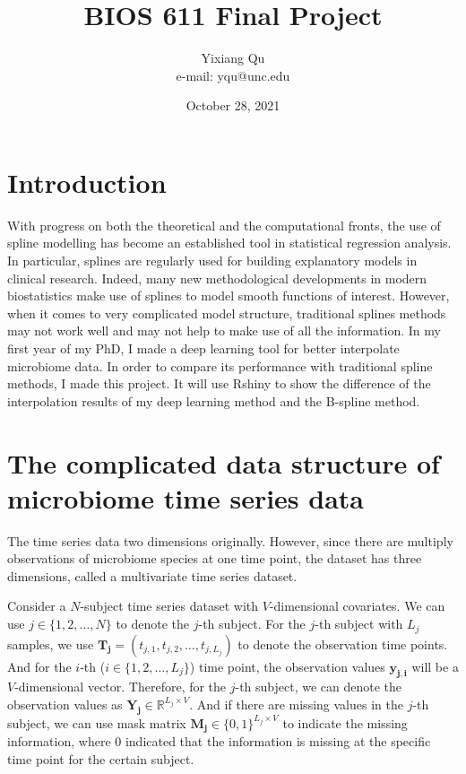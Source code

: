 \documentclass{article}
\begin{document}
\title{BIOS 611 Final Project}
\author{Yixiang Qu \\ e-mail: yqu@unc.edu}
\date{October 28, 2021}
\maketitle

\section{Introduction}
With progress on both the theoretical and the computational fronts, the use of spline modelling has become an established tool in statistical regression analysis. In particular, splines are regularly used for building explanatory models in clinical research. Indeed, many new methodological developments in modern biostatistics make use of splines to model smooth functions of interest. However, when it comes to very complicated model structure, traditional splines methods may not work well and may not help to make use of all the information. In my first year of my PhD, I made a deep learning tool for better interpolate microbiome data. In order to compare its performance with traditional spline methods, I made this project. It will use Rshiny to show the difference of the interpolation results of my deep learning method and the B-spline method.

\section{The complicated data structure of microbiome time series data}

The time series data two dimensions originally. However, since there are multiply observations of microbiome species at one time point, the dataset has three dimensions, called a multivariate time series dataset.

Consider a $N$-subject time series dataset with $V$-dimensional covariates. We can use $j \in \{1,2,\ldots,N \}$ to denote the $j$-th subject. For the $j$-th subject with $L_j$ samples, we use $\mathbf{T_j} = (t_{j,1}, t_{j,2}, \ldots, t_{j,L_j})$ to denote the observation time points. And for the $i$-th ($i \in\{1,2, \ldots, L_j\}$) time point, the observation values $\mathbf{y_{j,i}}$ will be a $V$-dimensional vector. Therefore, for the $j$-th subject, we can denote the observation values as $\mathbf{Y_j}\in \mathbb{R}^{L_{j}\times V}$. And if there are missing values in the $j$-th subject, we can use mask matrix $\mathbf{M_j}\in\{0,1\}^{L_{j}\times V}$ to indicate the missing information, where 0 indicated that the information is missing at the specific time point for the certain subject.
\end{document}
